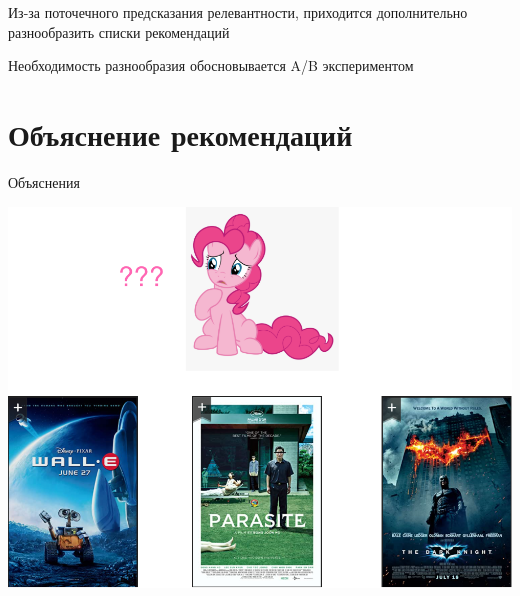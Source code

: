 \documentclass[11pt,aspectratio=169,handout]{beamer}
\begin{document}
\begin{frame}{}

\begin{tcolorbox}[colback=info!5,colframe=info!80,title=]
Из-за поточечного предсказания релевантности, приходится дополнительно разнообразить списки рекомендаций
\end{tcolorbox}

\begin{tcolorbox}[colback=info!5,colframe=info!80,title=]
Необходимость разнообразия обосновывается A/B экспериментом
\end{tcolorbox}

\end{frame}

\section{Объяснение рекомендаций}

\begin{frame}{Объяснения}

\begin{center}
\includegraphics[scale=0.22]{images/explainability-1.png}
\end{center}

\end{frame}
\end{document}
